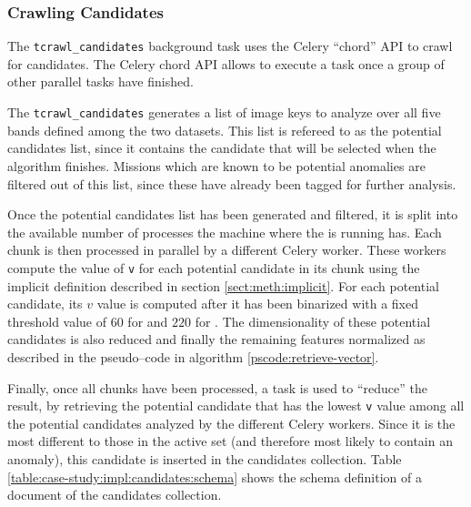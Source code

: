 \subsubsection{Crawling Candidates} \label{subsubsect:case-study:impl:crawling-candidates}

The \texttt{tcrawl\_candidates} background task uses the Celery ``chord'' API to crawl for candidates. The Celery chord API allows to execute a task once a group of other parallel tasks have finished. \newline

The \texttt{tcrawl\_candidates} generates a list of image keys to analyze over all five bands defined among the two datasets. This list is refereed to as the potential candidates list, since it contains the candidate that will be selected when the algorithm finishes. Missions which are known to be potential anomalies are filtered out of this list, since these have already been tagged for further analysis. \newline

Once the potential candidates list has been generated and filtered, it is split into the available number of processes the machine where the \mlblinkapi is running has. Each chunk is then processed in parallel by a different Celery worker. These workers compute the value of \texttt{v} for each potential candidate in its chunk using the implicit definition described in section \ref{sect:meth:implicit}. For each potential candidate, its $v$ value is computed after it has been binarized with a fixed threshold value of $60$ for \usno and $220$ for \panstarrs. The dimensionality of these potential candidates is also reduced and finally the remaining features normalized as described in the pseudo--code in algorithm \ref{pscode:retrieve-vector}. \newline

Finally, once all chunks have been processed, a task is used to ``reduce'' the result, by retrieving the potential candidate that has the lowest \texttt{v} value among all the potential candidates analyzed by the different Celery workers. Since it is the most different to those in the active set (and therefore most likely to contain an anomaly), this candidate is inserted in the candidates collection. Table \ref{table:case-study:impl:candidates:schema} shows the schema definition of a document of the candidates collection.

